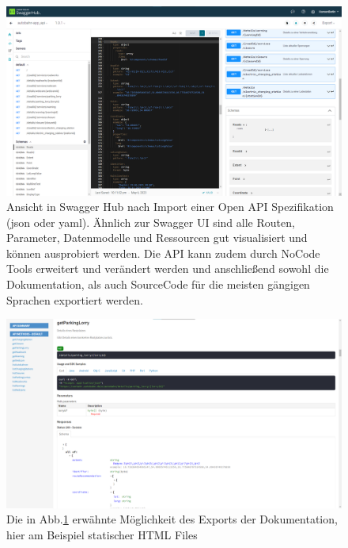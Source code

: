 \documentclass[notitlepage, hidelinks]{article}
\begin{document}
\begin{figure}[H]
\centering
  \includegraphics[width=\textwidth]{images/apispecs1.png}
  \caption{Ansicht in Swagger Hub nach Import einer Open API Spezifikation (json oder yaml). Ähnlich zur Swagger UI sind alle Routen, Parameter, Datenmodelle und Ressourcen gut visualisiert und können ausprobiert werden. Die API kann zudem durch NoCode Tools erweitert und verändert werden und anschließend sowohl die Dokumentation, als auch SourceCode für die meisten gängigen Sprachen exportiert werden.}
  \label{apispecs1}
\end{figure}

\begin{figure}[H]
\centering
  \includegraphics[width=\textwidth]{images/apispecs2.png}
  \caption{Die in Abb.\ref{apispecs1} erwähnte Möglichkeit des Exports der Dokumentation, hier am Beispiel statischer HTML Files}
  \label{apispecs2}
\end{figure}
\end{document}
